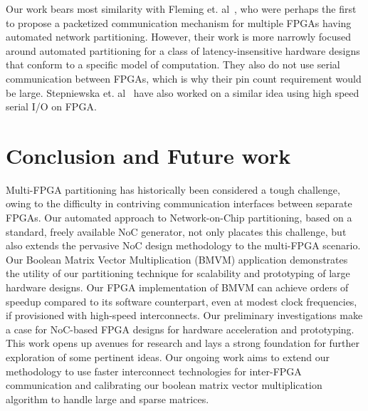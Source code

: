 \documentclass[conference, 9pt]{IEEEtran}
\newcommand{\blue}[1]{\textcolor{blue}{#1}}
\begin{document}
Our work bears most similarity with Fleming et. al~\cite{Fleming:2012:LLE:2145694.2145725}, who were perhaps the first to propose a packetized communication mechanism for multiple FPGAs having automated network partitioning. However, their work is more narrowly focused around automated partitioning for a class of latency-insensitive hardware designs that conform to a specific model of computation. They also do not use serial communication between FPGAs, which is why their pin count requirement would be large. Stepniewska et. al~\cite{stepniewska2010network} have also worked on a similar idea using high speed serial I/O on FPGA.



\section{Conclusion and Future work}
\label{sec:conclusion}

Multi-FPGA partitioning has historically been considered a tough challenge, owing to the difficulty in contriving communication interfaces between separate FPGAs. Our automated approach to Network-on-Chip partitioning, based on a standard, freely available NoC generator, not only placates this challenge, but also extends the pervasive NoC design methodology to the multi-FPGA scenario. Our Boolean Matrix Vector Multiplication (BMVM) application demonstrates the utility of our partitioning technique for scalability and prototyping of large hardware designs. Our FPGA implementation of BMVM can achieve orders of speedup compared to its software counterpart, even at modest clock frequencies, if provisioned with high-speed interconnects. Our preliminary investigations make a case for NoC-based FPGA designs for hardware acceleration and prototyping. This work opens up avenues for research and lays a strong foundation for further exploration of some pertinent ideas. Our ongoing work aims to extend our methodology to use faster interconnect technologies for inter-FPGA communication and calibrating our boolean matrix vector multiplication algorithm to handle large and sparse matrices.




\end{document}
